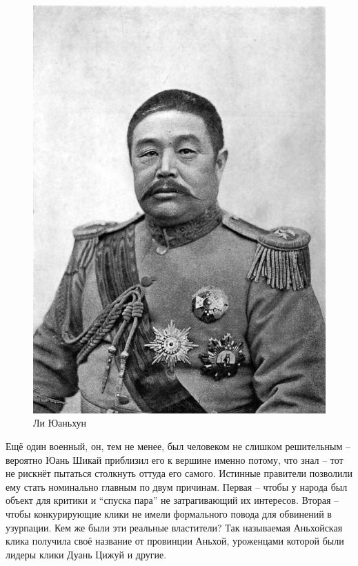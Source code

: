 \begin{figure}[h!tb] 
	\centering\includegraphics[scale=0.8]{Glava4/PQ6zgwNhs98.jpg}
	\caption{Ли Юаньхун}%
\end{figure}
Ещё один военный, он, тем не менее, был человеком не слишком решительным – вероятно Юань Шикай приблизил его к вершине именно потому, что знал – тот не рискнёт пытаться столкнуть оттуда его самого. Истинные правители позволили ему стать номинально главным по двум причинам. Первая – чтобы у народа был объект для критики и “спуска пара” не затрагивающий их интересов. Вторая – чтобы конкурирующие клики не имели формального повода для обвинений в узурпации. Кем же были эти реальные властители? Так называемая Аньхойская клика получила своё название от провинции Аньхой, уроженцами которой были лидеры клики Дуань Цижуй и другие. 

